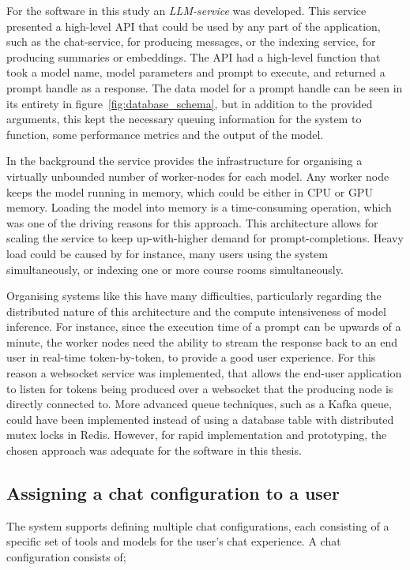 For the software in this study an \textit{LLM-service} was developed. This service presented a high-level API that could be used by any part of the application, such as the chat-service, for producing messages, or the indexing service, for producing summaries or embeddings. The API had a high-level function that took a model name, model parameters and prompt to execute, and returned a prompt handle as a response. The data model for a prompt handle can be seen in its entirety in figure~\ref{fig:database_schema}, but in addition to the provided arguments, this kept the necessary queuing information for the system to function, some performance metrics and the output of the model.


In the background the service provides the infrastructure for organising a virtually unbounded number of worker-nodes for each model. Any worker node keeps the model running in memory, which could be either in CPU or GPU memory. Loading the model into memory is a time-consuming operation, which was one of the driving reasons for this approach. This architecture allows for scaling the service to keep up-with-higher demand for prompt-completions. Heavy load could be caused by for instance, many users using the system simultaneously, or indexing one or more course rooms simultaneously.


Organising systems like this have many difficulties, particularly regarding the distributed nature of this architecture and the compute intensiveness of model inference. For instance, since the execution time of a prompt can be upwards of a minute, the worker nodes need the ability to stream the response back to an end user in real-time token-by-token, to provide a good user experience. For this reason a websocket service was implemented, that allows the end-user application to listen for tokens being produced over a websocket that the producing node is directly connected to. More advanced queue techniques, such as a Kafka queue, could have been implemented instead of using a database table with distributed mutex locks in Redis. However, for rapid implementation and prototyping, the chosen approach was adequate for the software in this thesis.
\subsection{Assigning a chat configuration to a user}


The system supports defining multiple chat configurations, each consisting of a specific set of tools and models for the user’s chat experience. A chat configuration consists of;


